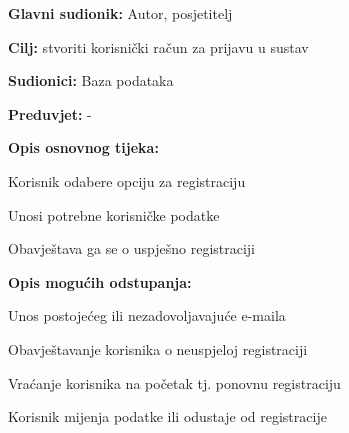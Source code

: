 					\noindent {}
					\begin{packed_item}
	
						\item \textbf{Glavni sudionik: }Autor, posjetitelj
						\item  \textbf{Cilj:} stvoriti korisnički račun za prijavu u sustav
						\item  \textbf{Sudionici:} Baza podataka
						\item  \textbf{Preduvjet:} -
						\item  \textbf{Opis osnovnog tijeka:}
						
						\item[] \begin{packed_enum}
	
							\item Korisnik odabere opciju za registraciju
							\item Unosi potrebne korisničke podatke
							\item Obavještava ga se o uspješno registraciji
						\end{packed_enum}
						
						\item  \textbf{Opis mogućih odstupanja:}
						
						\item[] \begin{packed_enum}
	
							\item Unos postojećeg ili nezadovoljavajuće e-maila

							\item[] \begin{packed_enum}
								
								\item Obavještavanje korisnika o neuspjeloj registraciji
								\item Vraćanje korisnika na početak tj. ponovnu registraciju
								\item Korisnik mijenja podatke ili odustaje od registracije
								
							\end{packed_enum}
							
						\end{packed_enum}
					\end{packed_item}

